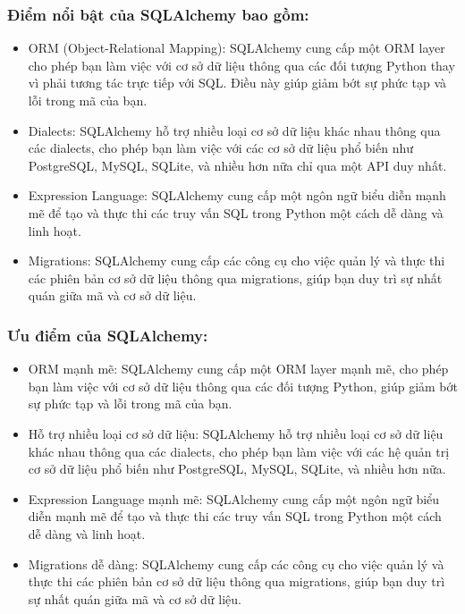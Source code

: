 \documentclass[a4paper]{article}
\begin{document}
\subsubsection{Điểm nổi bật của SQLAlchemy bao gồm:}
\begin{itemize}
	\item ORM (Object-Relational Mapping): SQLAlchemy cung cấp một ORM layer cho phép bạn làm việc với cơ sở dữ liệu thông qua các đối tượng Python thay vì phải tương tác trực tiếp với SQL. Điều này giúp giảm bớt sự phức tạp và lỗi trong mã của bạn.
    \item Dialects: SQLAlchemy hỗ trợ nhiều loại cơ sở dữ liệu khác nhau thông qua các dialects, cho phép bạn làm việc với các cơ sở dữ liệu phổ biến như PostgreSQL, MySQL, SQLite, và nhiều hơn nữa chỉ qua một API duy nhất.
    \item Expression Language: SQLAlchemy cung cấp một ngôn ngữ biểu diễn mạnh mẽ để tạo và thực thi các truy vấn SQL trong Python một cách dễ dàng và linh hoạt.
    \item Migrations: SQLAlchemy cung cấp các công cụ cho việc quản lý và thực thi các phiên bản cơ sở dữ liệu thông qua migrations, giúp bạn duy trì sự nhất quán giữa mã và cơ sở dữ liệu.
\end{itemize}
\subsubsection{Ưu điểm của SQLAlchemy:}
\begin{itemize}
	\item ORM mạnh mẽ: SQLAlchemy cung cấp một ORM layer mạnh mẽ, cho phép bạn làm việc với cơ sở dữ liệu thông qua các đối tượng Python, giúp giảm bớt sự phức tạp và lỗi trong mã của bạn.
    \item Hỗ trợ nhiều loại cơ sở dữ liệu: SQLAlchemy hỗ trợ nhiều loại cơ sở dữ liệu khác nhau thông qua các dialects, cho phép bạn làm việc với các hệ quản trị cơ sở dữ liệu phổ biến như PostgreSQL, MySQL, SQLite, và nhiều hơn nữa.
    \item Expression Language mạnh mẽ: SQLAlchemy cung cấp một ngôn ngữ biểu diễn mạnh mẽ để tạo và thực thi các truy vấn SQL trong Python một cách dễ dàng và linh hoạt.
    \item Migrations dễ dàng: SQLAlchemy cung cấp các công cụ cho việc quản lý và thực thi các phiên bản cơ sở dữ liệu thông qua migrations, giúp bạn duy trì sự nhất quán giữa mã và cơ sở dữ liệu.
\end{itemize}
\end{document}
